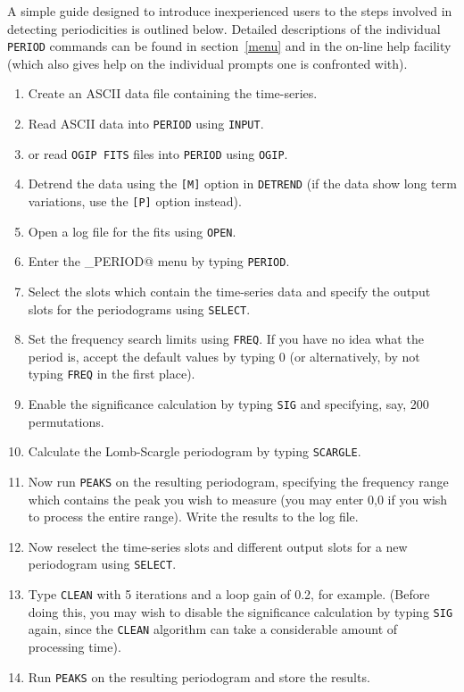 A simple guide designed to introduce inexperienced users to the steps involved 
in detecting periodicities is outlined below. Detailed descriptions of the
individual {\tt PERIOD} commands can be found in section~\ref{menu} and in
the on-line help facility (which also gives help on the individual prompts
one is confronted with). 

\begin{enumerate}
\item Create an ASCII data file containing the time-series.
\item Read ASCII data into {\tt PERIOD} using {\tt INPUT}. 
\item or read {\tt OGIP FITS} files into {\tt PERIOD} using {\tt OGIP}.
\item Detrend the data using the {\tt [M]} option in {\tt DETREND} (if the
data show long term variations, use the {\tt [P]} option instead).
\item Open a log file for the fits using {\tt OPEN}. 
\item Enter the \verb@PERIOD_PERIOD@ menu by typing {\tt PERIOD}.
\item Select the slots which contain the time-series data and specify the output
slots for the periodograms using {\tt SELECT}.
\item Set the frequency search limits using {\tt FREQ}. If you have no idea
what the period is, accept the default values by typing 0 (or alternatively, 
by not typing {\tt FREQ} in the first place). 
\item Enable the significance calculation by typing {\tt SIG} and specifying,
say, 200 permutations.
\item Calculate the Lomb-Scargle periodogram by typing {\tt SCARGLE}.
\item Now run {\tt PEAKS} on the resulting periodogram, specifying the
frequency range which contains the peak you wish to measure (you may enter 0,0
if you wish to process the entire range). Write the results to the log file.
\item Now reselect the time-series slots and different output slots for a new
periodogram using {\tt SELECT}.
\item Type {\tt CLEAN} with 5 iterations and a loop gain of 0.2, for example.
(Before doing this, you may wish to disable the significance calculation by 
typing {\tt SIG} again, since the {\tt CLEAN} algorithm can take a 
considerable amount of processing time).
\item Run {\tt PEAKS} on the resulting periodogram and store the results.

\end{enumerate}
